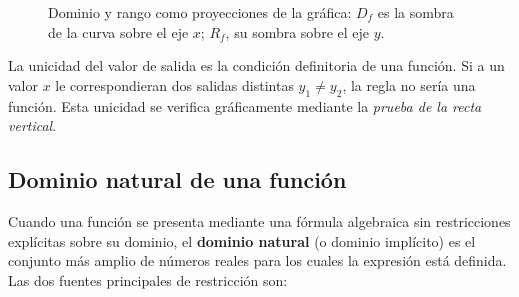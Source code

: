 \begin{figure}[!htbp]
\centering
{}
\caption{Dominio y rango como proyecciones de la gráfica: $D_f$ es la sombra
de la curva sobre el eje $x$; $R_f$, su sombra sobre el eje $y$.}
\label{fig:dominio_rango}
\end{figure}

\begin{rem}
La unicidad del valor de salida es la condición definitoria de una función. Si a un valor $x$ le correspondieran dos salidas distintas $y_1 \neq y_2$, la regla no sería una función. Esta unicidad se verifica gráficamente mediante la \emph{prueba de la recta vertical}.
\end{rem}

\subsection{Dominio natural de una función}

Cuando una función se presenta mediante una fórmula algebraica sin restricciones explícitas sobre su dominio, el \textbf{dominio natural} (o dominio implícito) es el conjunto más amplio de números reales para los cuales la expresión está definida. Las dos fuentes principales de restricción son:

